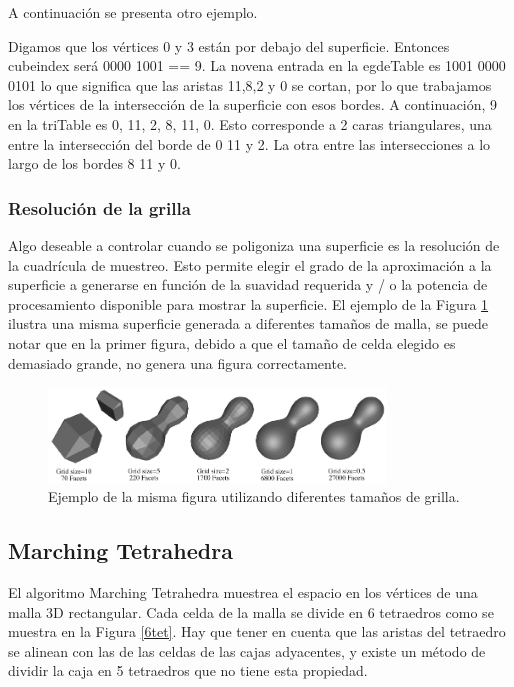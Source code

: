 \documentclass[12pt]{article}
\begin{document}
A continuación se presenta otro ejemplo.

Digamos que los vértices 0 y 3 están por debajo del superficie. Entonces cubeindex será 0000 1001 == 9. La novena entrada en la egdeTable es 1001 0000 0101 lo que significa que las aristas 11,8,2 y 0 se cortan, por lo que trabajamos los vértices de la intersección de la superficie con esos bordes.
A continuación, 9 en la triTable es 0, 11, 2, 8, 11, 0. Esto corresponde a 2 caras triangulares, una entre la intersección del borde de 0 11 y 2. La otra entre las intersecciones a lo largo de los bordes 8 11 y 0.
\subsubsection{Resolución de la grilla}
\noindent Algo deseable a controlar cuando se poligoniza una superficie es la resolución de la cuadrícula de muestreo. Esto permite elegir el grado de la aproximación a la superficie a generarse en función de la suavidad requerida y / o la potencia de procesamiento disponible para mostrar la superficie. El ejemplo de la Figura \ref{mani} ilustra una misma superficie generada a diferentes tamaños de malla, se puede notar que en la primer figura, debido a que el tamaño de celda elegido es demasiado grande, no genera una figura correctamente.
\clearpage
\begin{figure}[h!]
\includegraphics[width=0.8\textwidth,center]{marchingcubes4.png}
\caption{Ejemplo de la misma figura utilizando diferentes tamaños de grilla.}
\label{mani}
\end{figure}

\subsection{Marching Tetrahedra}
\noindent El algoritmo Marching Tetrahedra\cite{marching}\cite{marchingt} muestrea el espacio en los vértices de una malla 3D rectangular. Cada celda de la malla se divide en 6 tetraedros como se muestra en la Figura \ref{6tet}. Hay que tener en cuenta que las aristas del tetraedro se alinean con las de las celdas de las cajas adyacentes, y existe un método de dividir la caja en 5 tetraedros que no tiene esta propiedad.
\end{document}
